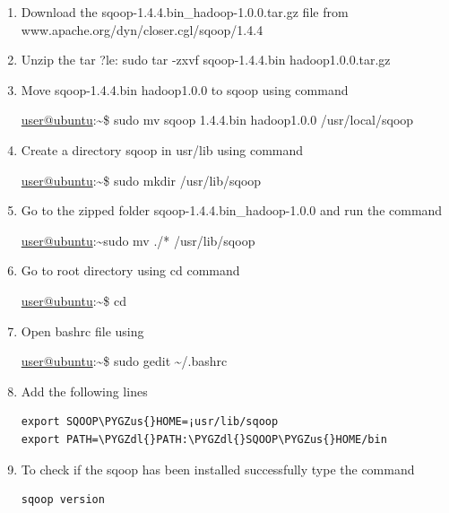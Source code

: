 \documentclass[letterpaper,10pt,english]{sphinxmanual}
\def\PYGZus{\char`\_}
\def\PYGZdl{\char`\$}
\begin{document}
\begin{enumerate}
\item {} 
Download the sqoop-1.4.4.bin\_hadoop-1.0.0.tar.gz  file from
www.apache.org/dyn/closer.cgl/sqoop/1.4.4

\item {} 
Unzip the tar ?le: sudo tar -zxvf sqoop-1.4.4.bin hadoop1.0.0.tar.gz

\item {} 
Move sqoop-1.4.4.bin hadoop1.0.0 to sqoop using command

\href{mailto:user@ubuntu}{user@ubuntu}:\textasciitilde{}\$  sudo mv sqoop  1.4.4.bin hadoop1.0.0 /usr/local/sqoop

\item {} 
Create a directory sqoop in usr/lib using command

\href{mailto:user@ubuntu}{user@ubuntu}:\textasciitilde{}\$ sudo mkdir /usr/lib/sqoop

\item {} 
Go to the zipped folder sqoop-1.4.4.bin\_hadoop-1.0.0 and run the command

\href{mailto:user@ubuntu}{user@ubuntu}:\textasciitilde{}sudo mv ./* /usr/lib/sqoop

\item {} 
Go to root directory using cd command

\href{mailto:user@ubuntu}{user@ubuntu}:\textasciitilde{}\$  cd

\item {} 
Open bashrc file using

\href{mailto:user@ubuntu}{user@ubuntu}:\textasciitilde{}\$  sudo gedit \textasciitilde{}/.bashrc

\item {} 
Add the following lines

\begin{Verbatim}[commandchars=\\\{\}]
export SQOOP\PYGZus{}HOME=¡usr/lib/sqoop
export PATH=\PYGZdl{}PATH:\PYGZdl{}SQOOP\PYGZus{}HOME/bin
\end{Verbatim}

\item {} 
To check if the sqoop has been installed  successfully type the command

\begin{Verbatim}[commandchars=\\\{\}]
sqoop version
\end{Verbatim}

\end{enumerate}
\end{document}
